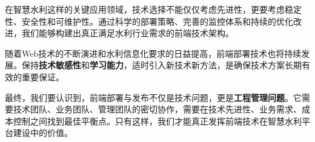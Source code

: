 在智慧水利这样的关键应用领域，技术选择不能仅仅考虑先进性，更要考虑稳定性、安全性和可维护性。通过科学的部署策略、完善的监控体系和持续的优化改进，我们能够构建出真正满足水利行业需求的前端技术架构。

随着Web技术的不断演进和水利信息化要求的日益提高，前端部署技术也将持续发展。保持\textbf{技术敏感性}和\textbf{学习能力}，适时引入新技术新方法，是确保技术方案长期有效的重要保证。

最终，我们要认识到，前端部署与发布不仅是技术问题，更是\textbf{工程管理问题}。它需要技术团队、业务团队、管理团队的密切协作，需要在技术先进性、业务需求、成本控制之间找到最佳平衡点。只有这样，我们才能真正发挥前端技术在智慧水利平台建设中的价值。
